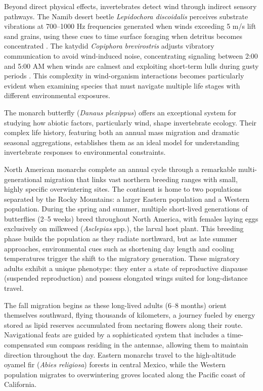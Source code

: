 Beyond direct physical effects, invertebrates detect wind through indirect sensory pathways. The Namib desert beetle \textit{Lepidochora discoidalis} perceives substrate vibrations at 700--1000 Hz frequencies generated when winds exceeding 5 m/s lift sand grains, using these cues to time surface foraging when detritus becomes concentrated \citep{seelySandstormsTenebrionidBeetles1997}. The katydid \textit{Copiphora brevirostris} adjusts vibratory communication to avoid wind-induced noise, concentrating signaling between 2:00 and 5:00 AM when winds are calmest and exploiting short-term lulls during gusty periods \citep{rohmerGoneWindSignal2010}. This complexity in wind-organism interactions becomes particularly evident when examining species that must navigate multiple life stages with different environmental exposures.

The monarch butterfly (\textit{Danaus plexippus}) offers an exceptional system for studying how abiotic factors, particularly wind, shape invertebrate ecology. Their complex life history, featuring both an annual mass migration and dramatic seasonal aggregations, establishes them as an ideal model for understanding invertebrate responses to environmental constraints.

North American monarchs complete an annual cycle through a remarkable multi-generational migration that links vast northern breeding ranges with small, highly specific overwintering sites. The continent is home to two populations separated by the Rocky Mountains: a larger Eastern population and a Western population. During the spring and summer, multiple short-lived generations of butterflies (2--5 weeks) breed throughout North America, with females laying eggs exclusively on milkweed (\textit{Asclepias} spp.), the larval host plant. This breeding phase builds the population as they radiate northward, but as late summer approaches, environmental cues such as shortening day length and cooling temperatures trigger the shift to the migratory generation. These migratory adults exhibit a unique phenotype: they enter a state of reproductive diapause (suspended reproduction) and possess elongated wings suited for long-distance travel.

The fall migration begins as these long-lived adults (6--8 months) orient themselves southward, flying thousands of kilometers, a journey fueled by energy stored as lipid reserves accumulated from nectaring flowers along their route. Navigational feats are guided by a sophisticated system that includes a time-compensated sun compass residing in the antennae, allowing them to maintain direction throughout the day. Eastern monarchs travel to the high-altitude oyamel fir (\textit{Abies religiosa}) forests in central Mexico, while the Western population migrates to overwintering groves located along the Pacific coast of California.

